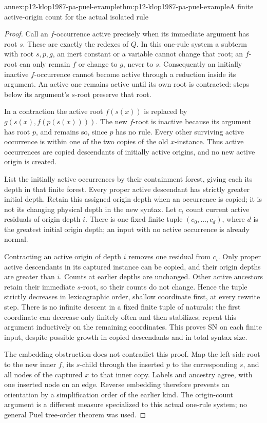 \begin{annexitem}{annex:p12-klop1987-pa-puel-example}{thm:p12-klop1987-pa-puel-example}{A finite active-origin count for the actual isolated rule}
\begin{proof}
Call an \(f\)-occurrence active precisely when its immediate
argument has root \(s\). These are exactly the redexes of \(Q\).
In this one-rule system a subterm with root \(s,p,g\), an inert
constant or a variable cannot change that root; an \(f\)-root
can only remain \(f\) or change to \(g\), never to \(s\).
Consequently an initially inactive \(f\)-occurrence cannot
become active through a reduction inside its argument. An active
one remains active until its own root is contracted: steps below
its argument's \(s\)-root preserve that root.

In a contraction the active root \(f(s(x))\) is replaced by
\(g(s(x),f(p(s(x))))\). The new \(f\)-root is inactive
because its argument has root \(p\), and remains so, since
\(p\) has no rule. Every other surviving active occurrence
is within one of the two copies of the old \(x\)-instance.
Thus active occurrences are copied descendants of initially
active origins, and no new active origin is created.

List the initially active occurrences by their containment forest,
giving each its depth in that finite forest. Every proper active
descendant has strictly greater initial depth. Retain this assigned
origin depth when an occurrence is copied; it is not its changing
physical depth in the new syntax. Let \(c_i\) count current
active residuals of origin depth \(i\). There is one fixed
finite tuple \((c_0,\ldots,c_d)\), where \(d\) is the greatest
initial origin depth; an input with no active occurrence is already
normal.

Contracting an active origin of depth \(i\) removes one residual
from \(c_i\). Only proper active descendants in its captured
instance can be copied, and their origin depths are greater than
\(i\). Counts at earlier depths are unchanged. Other active
ancestors retain their immediate \(s\)-root, so their counts
do not change. Hence the tuple strictly decreases in lexicographic
order, shallow coordinate first, at every rewrite step.
There is no infinite descent in a fixed finite tuple of naturals:
the first coordinate can decrease only finitely often and then
stabilizes; repeat this argument inductively on the remaining
coordinates. This proves SN on each finite input, despite possible
growth in copied descendants and in total syntax size.

The embedding obstruction does not contradict this proof. Map
the left-side root to the new inner \(f\), its \(s\)-child
through the inserted \(p\) to the corresponding \(s\), and
all nodes of the captured \(x\) to that inner copy. Labels
and ancestry agree, with one inserted node on an edge. Reverse
embedding therefore prevents an orientation by a simplification
order of the earlier kind. The origin-count argument is a different
measure specialized to this actual one-rule system; no general
Puel tree-order theorem was used.
\end{proof}
\end{annexitem}

